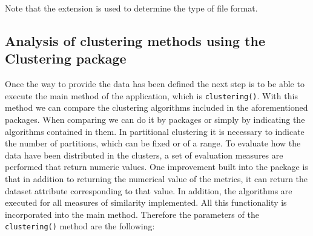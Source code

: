 \documentclass[
]{article}
\begin{document}
Note that the extension is used to determine the type of file format.

\hypertarget{analysis-of-clustering-methods-using-the-clustering-package}{%
\subsection{\texorpdfstring{Analysis of clustering methods using the
\textbf{Clustering}
package}{Analysis of clustering methods using the Clustering package}}\label{analysis-of-clustering-methods-using-the-clustering-package}}

Once the way to provide the data has been defined the next step is to be
able to execute the main method of the application, which is
\texttt{clustering()}. With this method we can compare the clustering
algorithms included in the aforementioned packages. When comparing we
can do it by packages or simply by indicating the algorithms contained
in them. In partitional clustering it is necessary to indicate the
number of partitions, which can be fixed or of a range. To evaluate how
the data have been distributed in the clusters, a set of evaluation
measures are performed that return numeric values. One improvement built
into the package is that in addition to returning the numerical value of
the metrics, it can return the dataset attribute corresponding to that
value. In addition, the algorithms are executed for all measures of
similarity implemented. All this functionality is incorporated into the
main method. Therefore the parameters of the \texttt{clustering()}
method are the following:
\end{document}
